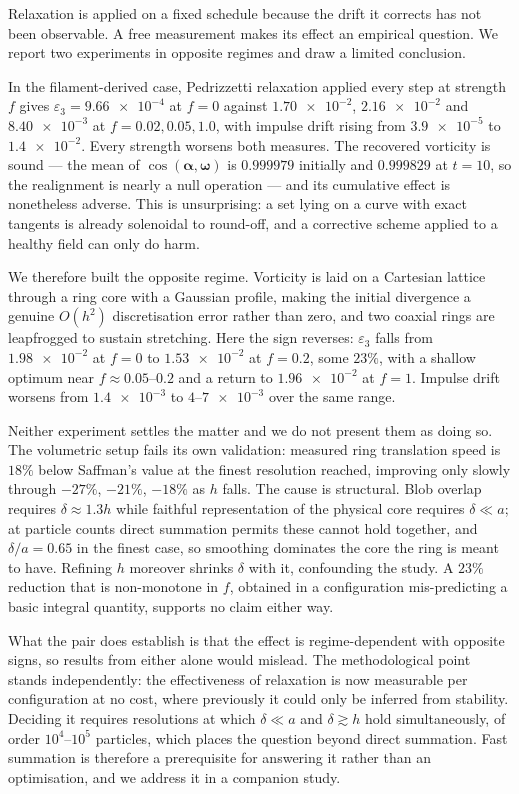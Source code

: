 \documentclass[preprint,12pt,3p]{elsarticle}
\theoremstyle{remark}
\newcommand{\eps}{\varepsilon_3}
\newcommand{\bomega}{\boldsymbol{\omega}}
\newcommand{\balpha}{\boldsymbol{\alpha}}
\begin{document}
Relaxation is applied on a fixed schedule because the drift it corrects has not
been observable. A free measurement makes its effect an empirical question. We
report two experiments in opposite regimes and draw a limited conclusion.

In the filament-derived case, Pedrizzetti relaxation applied every step at
strength $f$ gives $\eps = \num{9.66e-4}$ at $f=0$ against $\num{1.70e-2}$,
$\num{2.16e-2}$ and $\num{8.40e-3}$ at $f = 0.02, 0.05, 1.0$, with impulse drift
rising from $\num{3.9e-5}$ to $\num{1.4e-2}$. Every strength worsens both
measures. The recovered vorticity is sound --- the mean of
$\cos(\balpha,\bomega)$ is $0.999979$ initially and $0.999829$ at $t=10$, so the
realignment is nearly a null operation --- and its cumulative effect is
nonetheless adverse. This is unsurprising: a set lying on a curve with exact
tangents is already solenoidal to round-off, and a corrective scheme applied to
a healthy field can only do harm.

We therefore built the opposite regime. Vorticity is laid on a Cartesian
lattice through a ring core with a Gaussian profile, making the initial
divergence a genuine $O(h^2)$ discretisation error rather than zero, and two
coaxial rings are leapfrogged to sustain stretching. Here the sign reverses:
$\eps$ falls from $\num{1.98e-2}$ at $f=0$ to $\num{1.53e-2}$ at $f=0.2$, some
$23\%$, with a shallow optimum near $f\approx0.05$--$0.2$ and a return to
$\num{1.96e-2}$ at $f=1$. Impulse drift worsens from $\num{1.4e-3}$ to
$\num{4}$--$\num{7e-3}$ over the same range.

Neither experiment settles the matter and we do not present them as doing so.
The volumetric setup fails its own validation: measured ring translation speed
is $18\%$ below Saffman's value at the finest resolution reached, improving only
slowly through $-27\%$, $-21\%$, $-18\%$ as $h$ falls. The cause is structural.
Blob overlap requires $\delta\approx1.3h$ while faithful representation of the
physical core requires $\delta\ll a$; at particle counts direct summation
permits these cannot hold together, and $\delta/a = 0.65$ in the finest case, so
smoothing dominates the core the ring is meant to have. Refining $h$ moreover
shrinks $\delta$ with it, confounding the study. A $23\%$ reduction that is
non-monotone in $f$, obtained in a configuration mis-predicting a basic integral
quantity, supports no claim either way.

What the pair does establish is that the effect is regime-dependent with
opposite signs, so results from either alone would mislead. The methodological
point stands independently: the effectiveness of relaxation is now measurable
per configuration at no cost, where previously it could only be inferred from
stability. Deciding it requires resolutions at which $\delta\ll a$ and
$\delta\gtrsim h$ hold simultaneously, of order $10^4$--$10^5$ particles, which
places the question beyond direct summation. Fast summation is therefore a
prerequisite for answering it rather than an optimisation, and we address it in
a companion study.
\end{document}
